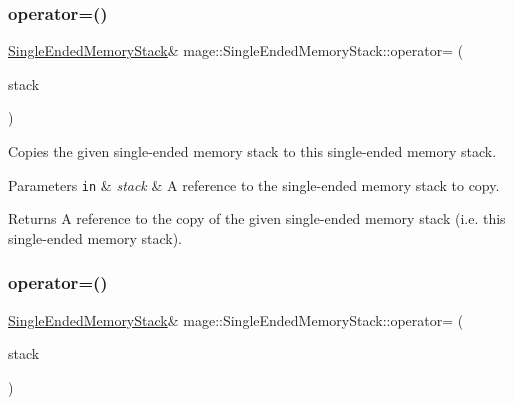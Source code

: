 \subsubsection{\texorpdfstring{operator=()}{operator=()}\hspace{0.1cm}{\footnotesize\ttfamily [1/2]}}
{\footnotesize\ttfamily \mbox{\hyperlink{classmage_1_1_single_ended_memory_stack}{Single\+Ended\+Memory\+Stack}}\& mage\+::\+Single\+Ended\+Memory\+Stack\+::operator= (\begin{DoxyParamCaption}\item[{const \mbox{\hyperlink{classmage_1_1_single_ended_memory_stack}{Single\+Ended\+Memory\+Stack}} \&}]{stack }\end{DoxyParamCaption})\hspace{0.3cm}{\ttfamily [delete]}}

Copies the given single-\/ended memory stack to this single-\/ended memory stack.


\begin{DoxyParams}[1]{Parameters}
\mbox{\tt in}  & {\em stack} & A reference to the single-\/ended memory stack to copy. \\
\hline
\end{DoxyParams}
\begin{DoxyReturn}{Returns}
A reference to the copy of the given single-\/ended memory stack (i.\+e. this single-\/ended memory stack). 
\end{DoxyReturn}
\mbox{\label{classmage_1_1_single_ended_memory_stack_a24613dc91ab6577aa57fbd55a4c81023}} 
\subsubsection{\texorpdfstring{operator=()}{operator=()}\hspace{0.1cm}{\footnotesize\ttfamily [2/2]}}
{\footnotesize\ttfamily \mbox{\hyperlink{classmage_1_1_single_ended_memory_stack}{Single\+Ended\+Memory\+Stack}}\& mage\+::\+Single\+Ended\+Memory\+Stack\+::operator= (\begin{DoxyParamCaption}\item[{\mbox{\hyperlink{classmage_1_1_single_ended_memory_stack}{Single\+Ended\+Memory\+Stack}} \&\&}]{stack }\end{DoxyParamCaption})\hspace{0.3cm}{\ttfamily [delete]}}


